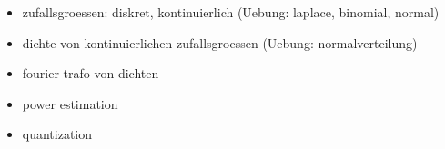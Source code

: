 \begin{itemize}
    \item zufallsgroessen: diskret, kontinuierlich (Uebung: laplace, binomial, normal)
    \item dichte von kontinuierlichen zufallsgroessen (Uebung: normalverteilung)
    \item fourier-trafo von dichten
    \item power estimation
    \item quantization
\end{itemize}
